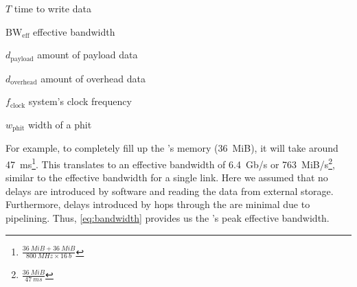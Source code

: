 \begin{eqexpl}[15mm]
    \item{$T$} time to write data
    \item{$\text{BW}_{\text{eff}}$} effective bandwidth
    \item{$d_{\text{payload}}$} amount of payload data
    \item{$d_{\text{overhead}}$} amount of overhead data
    \item{$f_{\text{clock}}$} system's clock frequency
    \item{$w_{\text{phit}}$} width of a phit
\end{eqexpl}

For example, to completely fill up the \graicore{}'s memory (\SI{36}{MiB}), it will take around \SI{47}{ms}\footnote{$\frac{\SI{36}{MiB} + \SI{36}{MiB}}{\SI{800}{MHz} \times \SI{16}{b}}$}.
This translates to an effective bandwidth of \SI{6.4}{Gb/s} or \SI{763}{MiB/s}\footnote{$\frac{\SI{36}{MiB}}{\SI{47}{ms}}$}, similar to the effective bandwidth for a single link.
Here we assumed that no delays are introduced by software and reading the data from external storage.
Furthermore, delays introduced by hops through the \confignoc{} are minimal due to pipelining.
Thus, \cref{eq:bandwidth} provides us the \confignoc{}'s peak effective bandwidth.
